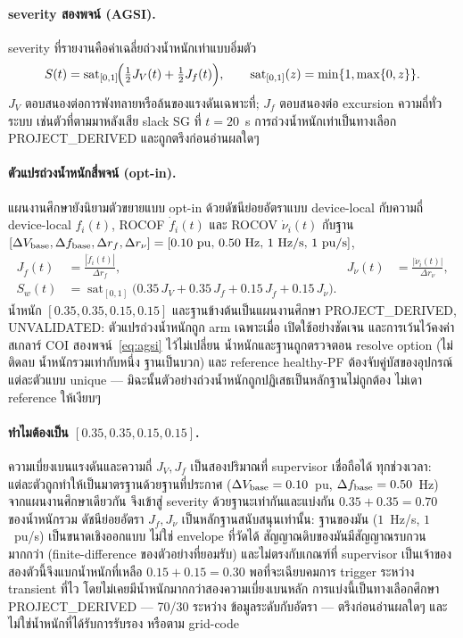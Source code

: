 \documentclass[12pt,a4paper]{article}
\newcommand{\sat}{\operatorname{sat}}
\begin{document}
\paragraph{severity สองพจน์ (AGSI).}
severity ที่รายงานคือค่าเฉลี่ยถ่วงน้ำหนักเท่าแบบอิ่มตัว
\begin{equation}
  S(t)=\sat_{[0,1]}\!\Bigl(\tfrac12 J_V(t)+\tfrac12 J_f(t)\Bigr),
  \qquad
  \sat_{[0,1]}(z)=\min\{1,\max\{0,z\}\}.
  \label{eq:agsi}
\end{equation}
$J_V$ ตอบสนองต่อการพังทลายหรือล้นของแรงดันเฉพาะที่; $J_f$ ตอบสนองต่อ
excursion ความถี่ทั่วระบบ เช่นตัวที่ตามมาหลังเสีย slack SG ที่ $t=20$~s
การถ่วงน้ำหนักเท่าเป็นทางเลือก \textsf{PROJECT\_DERIVED} และถูกตรึงก่อนอ่านผลใดๆ

\paragraph{ตัวแปรถ่วงน้ำหนักสี่พจน์ (opt-in).}
แผนงานศึกษายังนิยามตัวขยายแบบ opt-in ด้วยดัชนีย่อยอัตราแบบ device-local
กับความถี่ device-local $f_i(t)$, ROCOF $\dot f_i(t)$ และ ROCOV
$\dot\nu_i(t)$ กับฐาน
$[\Delta V_{\rm base},\Delta f_{\rm base},\Delta r_{f},\Delta r_{\nu}]
=[0.10~{\rm pu},\,0.50~{\rm Hz},\,1~{\rm Hz/s},\,1~{\rm pu/s}]$,
\begin{equation}
\begin{aligned}
  J_{\dot f}(t)&=\frac{|\dot f_i(t)|}{\Delta r_{f}},&
  J_{\dot\nu}(t)&=\frac{|\dot\nu_i(t)|}{\Delta r_{\nu}},\\
  S_{w}(t)&=\sat_{[0,1]}\!\bigl(
      0.35\,J_V+0.35\,J_f+0.15\,J_{\dot f}+0.15\,J_{\dot\nu}\bigr).&&
\end{aligned}
\label{eq:weighted}
\end{equation}
น้ำหนัก $[0.35,0.35,0.15,0.15]$ และฐานข้างต้นเป็นแผนงานศึกษา
\textsf{PROJECT\_DERIVED, UNVALIDATED}: ตัวแปรถ่วงน้ำหนักถูก arm เฉพาะเมื่อ
เปิดใช้อย่างชัดเจน และการเว้นไว้คงค่าสเกลาร์ COI สองพจน์~\eqref{eq:agsi}
ไว้ไม่เปลี่ยน น้ำหนักและฐานถูกตรวจตอน resolve option (ไม่ติดลบ น้ำหนักรวมเท่ากับหนึ่ง
ฐานเป็นบวก) และ reference healthy-PF ต้องจับคู่บัสของอุปกรณ์แต่ละตัวแบบ unique
--- มิฉะนั้นตัวอย่างถ่วงน้ำหนักถูกปฏิเสธเป็นหลักฐานไม่ถูกต้อง ไม่เดา reference
ให้เงียบๆ

\paragraph{ทำไมต้องเป็น $[0.35,0.35,0.15,0.15]$.}
ความเบี่ยงเบนแรงดันและความถี่ $J_V,J_f$ เป็นสองปริมาณที่ supervisor เชื่อถือได้
ทุกช่วงเวลา: แต่ละตัวถูกทำให้เป็นมาตรฐานด้วยฐานที่ประกาศ
($\Delta V_{\rm base}=0.10$~pu, $\Delta f_{\rm base}=0.50$~Hz)
จากแผนงานศึกษาเดียวกัน จึงเข้าสู่ severity ด้วยฐานะเท่ากันและแบ่งกัน
$0.35+0.35=0.70$ ของน้ำหนักรวม ดัชนีย่อยอัตรา $J_{\dot f},
J_{\dot\nu}$ เป็นหลักฐานสนับสนุนเท่านั้น: ฐานของมัน ($1$~Hz/s, $1$~pu/s)
เป็นขนาดเชิงออกแบบ ไม่ใช่ envelope ที่วัดได้ สัญญาณดิบของมันมีสัญญาณรบกวนมากกว่า
(finite-difference ของตัวอย่างที่ยอมรับ) และไม่ตรงกับเกณฑ์ที่ supervisor เป็นเจ้าของ
สองตัวนี้จึงแบกน้ำหนักที่เหลือ $0.15+0.15=0.30$ พอที่จะเฉียบคมการ trigger
ระหว่าง transient ที่ไว โดยไม่เคยมีน้ำหนักมากกว่าสองความเบี่ยงเบนหลัก
การแบ่งนี้เป็นทางเลือกศึกษา \textsf{PROJECT\_DERIVED} --- 70/30 ระหว่าง
ข้อมูลระดับกับอัตรา --- ตรึงก่อนอ่านผลใดๆ และไม่ใช่น้ำหนักที่ได้รับการรับรอง
หรือตาม grid-code
\end{document}
